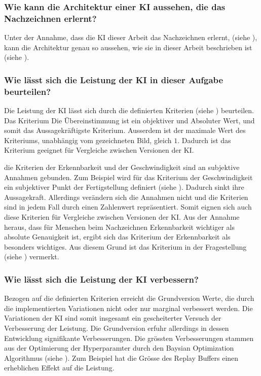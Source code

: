 \subsubsection*{Wie kann die Architektur einer KI aussehen, die das Nachzeichnen erlernt?}
\label{subsub:d_frage_unter_1}
Unter der Annahme, dass die KI dieser Arbeit das Nachzeichnen erlernt, (siehe
), kann die Architektur genau so aussehen, wie sie in
dieser Arbeit beschrieben ist (siehe ).

\subsubsection*{Wie lässt sich die Leistung der KI in dieser Aufgabe beurteilen?}
\label{subsub:d_frage_unter_2}
Die Leistung der KI lässt sich durch die definierten Kriterien (siehe
) beurteilen. Das Kriterium Die Übereinstimmung ist ein
objektiver und Absoluter Wert, und somit das Aussagekräftigste Kriterium.
Ausserdem ist der maximale Wert des Kriteriums, unabhängig vom gezeichneten
Bild, gleich $1$. Dadurch ist das Kriterium geeignet für Vergleiche zwischen
Versionen der KI.

die Kriterien der Erkennbarkeit und der Geschwindigkeit sind an subjektive
Annahmen gebunden. Zum Beispiel wird für das Kriterium der Geschwindigkeit ein
subjektiver Punkt der Fertigstellung definiert (siehe
). Dadurch sinkt ihre Aussagekraft. Allerdings
verändern sich die Annahmen nicht und die Kriterien sind in jedem Fall durch
einen Zahlenwert repräsentiert. Somit eignen sich auch diese Kriterien für
Vergleiche zwischen Versionen der KI. Aus der Annahme heraus, dass für Menschen
beim Nachzeichnen Erkennbarkeit wichtiger als absolute Genauigkeit ist, ergibt
sich das Kriterium der Erkennbarkeit als besonders wichtiges. Aus diesem Grund
ist das Kriterium in der Fragestellung (siehe )
vermerkt.


\subsubsection*{Wie lässt sich die Leistung der KI verbessern?}
\label{subsub:d_frage_unter_3}
Bezogen auf die definierten Kriterien erreicht die Grundversion Werte, die durch
die implementierten Variationen nicht oder nur marginal verbessert werden. Die
Variationen der KI sind somit insgesamt ein gescheiterter Versuch der
Verbesserung der Leistung. Die Grundversion erfuhr allerdings in dessen
Entwicklung signifikante Verbesserungen. Die grössten Verbesserungen stammen aus
der Optimierung der Hyperparamter durch den Baysian Optimization Algorithmus
(siehe ). Zum Beispiel hat die Grösse des Replay
Buffers einen erheblichen Effekt auf die Leistung.


